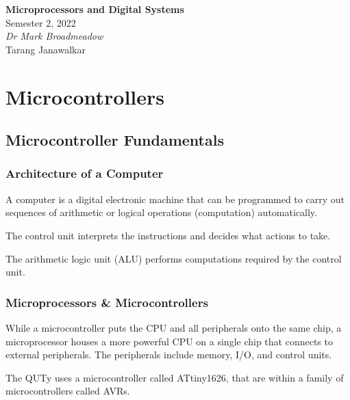 \documentclass{report}
\date{}
\newcommand{\unitName}{Microprocessors and Digital Systems}
\newcommand{\unitTime}{Semester 2, 2022}
\newcommand{\unitCoordinator}{Dr Mark Broadmeadow}
\newcommand{\documentAuthors}{Tarang Janawalkar}
\begin{document}
%
\begin{titlepage}
    \vspace*{\fill}
    \begin{center}
        \LARGE{\textbf{\unitName}} \\[0.1in]
        \normalsize{\unitTime} \\[0.2in]
        \normalsize\textit{\unitCoordinator} \\[0.2in]
        \documentAuthors
    \end{center}
    \vspace*{\fill}
    \doclicenseThis
    \thispagestyle{empty}
\end{titlepage}
\newpage
%
\tableofcontents
\newpage
%
\part{Microcontrollers}
\chapter{Microcontroller Fundamentals}
\section{Architecture of a Computer}
\begin{definition}[Computer]
    A computer is a digital electronic machine that can be programmed to carry
    out sequences of arithmetic or logical operations (computation) automatically.
\end{definition}
\begin{definition}
    The control unit interprets the instructions and decides what actions to take.
\end{definition}
\begin{definition}
    The arithmetic logic unit (ALU) performs computations required by the control unit.
\end{definition}
\section{Microprocessors \& Microcontrollers}
While a microcontroller puts the CPU and all peripherals onto the same chip,
a microprocessor houses a more powerful CPU on a single chip that connects to external peripherals.
The peripherals include memory, I/O, and control units.

The QUTy uses a microcontroller called ATtiny1626, that are within a family of microcontrollers called AVRs.
\end{document}
